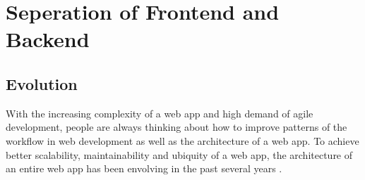 \section{Seperation of Frontend and Backend}


\subsection{Evolution}
With the increasing complexity of a web app and high demand of agile development, people are always thinking about how to improve patterns of the workflow in web development as well as the architecture of a web app. To achieve better scalability, maintainability and ubiquity of a web app, the architecture of an entire web app has been envolving in the past several years .

